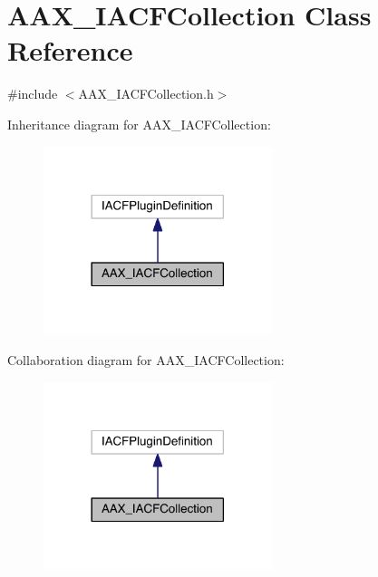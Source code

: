 \hypertarget{a00049}{}\section{A\+A\+X\+\_\+\+I\+A\+C\+F\+Collection Class Reference}
\label{a00049}


{\ttfamily \#include $<$A\+A\+X\+\_\+\+I\+A\+C\+F\+Collection.\+h$>$}



Inheritance diagram for A\+A\+X\+\_\+\+I\+A\+C\+F\+Collection\+:
\nopagebreak
\begin{figure}[H]
\begin{center}
\leavevmode
\includegraphics[width=189pt]{a00490}
\end{center}
\end{figure}


Collaboration diagram for A\+A\+X\+\_\+\+I\+A\+C\+F\+Collection\+:
\nopagebreak
\begin{figure}[H]
\begin{center}
\leavevmode
\includegraphics[width=189pt]{a00491}
\end{center}
\end{figure}


